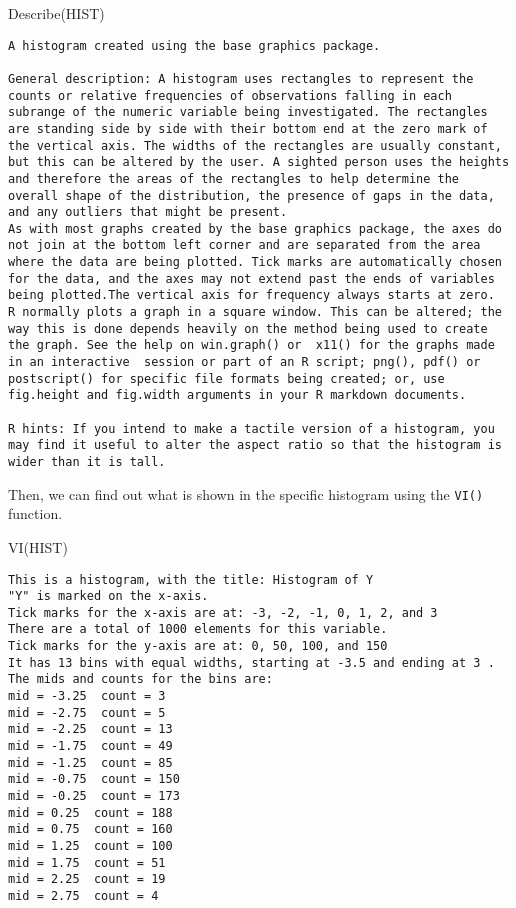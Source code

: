 \documentclass[
]{book}
\newenvironment{Shaded}{\begin{snugshade}}{\end{snugshade}}
\newcommand{\FunctionTok}[1]{\textcolor[rgb]{0.00,0.00,0.00}{#1}}
\newcommand{\NormalTok}[1]{#1}
\begin{document}
\begin{Shaded}
\begin{Highlighting}[]
\FunctionTok{Describe}\NormalTok{(HIST)}
\end{Highlighting}
\end{Shaded}

\begin{verbatim}
A histogram created using the base graphics package.

General description: A histogram uses rectangles to represent the counts or relative frequencies of observations falling in each subrange of the numeric variable being investigated. The rectangles are standing side by side with their bottom end at the zero mark of the vertical axis. The widths of the rectangles are usually constant, but this can be altered by the user. A sighted person uses the heights and therefore the areas of the rectangles to help determine the overall shape of the distribution, the presence of gaps in the data, and any outliers that might be present.
As with most graphs created by the base graphics package, the axes do not join at the bottom left corner and are separated from the area where the data are being plotted. Tick marks are automatically chosen for the data, and the axes may not extend past the ends of variables being plotted.The vertical axis for frequency always starts at zero.
R normally plots a graph in a square window. This can be altered; the way this is done depends heavily on the method being used to create the graph. See the help on win.graph() or  x11() for the graphs made in an interactive  session or part of an R script; png(), pdf() or postscript() for specific file formats being created; or, use fig.height and fig.width arguments in your R markdown documents.

R hints: If you intend to make a tactile version of a histogram, you may find it useful to alter the aspect ratio so that the histogram is wider than it is tall.
\end{verbatim}

Then, we can find out what is shown in the specific histogram using the \texttt{VI()} function.

\begin{Shaded}
\begin{Highlighting}[]
\FunctionTok{VI}\NormalTok{(HIST)}
\end{Highlighting}
\end{Shaded}

\begin{verbatim}
This is a histogram, with the title: Histogram of Y
"Y" is marked on the x-axis.
Tick marks for the x-axis are at: -3, -2, -1, 0, 1, 2, and 3 
There are a total of 1000 elements for this variable.
Tick marks for the y-axis are at: 0, 50, 100, and 150 
It has 13 bins with equal widths, starting at -3.5 and ending at 3 .
The mids and counts for the bins are:
mid = -3.25  count = 3 
mid = -2.75  count = 5 
mid = -2.25  count = 13 
mid = -1.75  count = 49 
mid = -1.25  count = 85 
mid = -0.75  count = 150 
mid = -0.25  count = 173 
mid = 0.25  count = 188 
mid = 0.75  count = 160 
mid = 1.25  count = 100 
mid = 1.75  count = 51 
mid = 2.25  count = 19 
mid = 2.75  count = 4
\end{verbatim}
\end{document}
